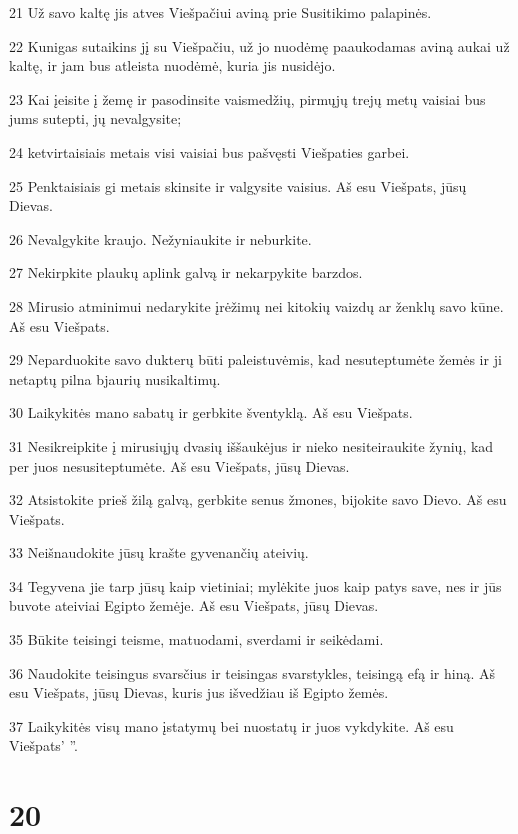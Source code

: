 \par 21 Už savo kaltę jis atves Viešpačiui aviną prie Susitikimo palapinės. 
\par 22 Kunigas sutaikins jį su Viešpačiu, už jo nuodėmę paaukodamas aviną aukai už kaltę, ir jam bus atleista nuodėmė, kuria jis nusidėjo. 
\par 23 Kai įeisite į žemę ir pasodinsite vaismedžių, pirmųjų trejų metų vaisiai bus jums sutepti, jų nevalgysite; 
\par 24 ketvirtaisiais metais visi vaisiai bus pašvęsti Viešpaties garbei. 
\par 25 Penktaisiais gi metais skinsite ir valgysite vaisius. Aš esu Viešpats, jūsų Dievas. 
\par 26 Nevalgykite kraujo. Nežyniaukite ir neburkite. 
\par 27 Nekirpkite plaukų aplink galvą ir nekarpykite barzdos. 
\par 28 Mirusio atminimui nedarykite įrėžimų nei kitokių vaizdų ar ženklų savo kūne. Aš esu Viešpats. 
\par 29 Neparduokite savo dukterų būti paleistuvėmis, kad nesuteptumėte žemės ir ji netaptų pilna bjaurių nusikaltimų. 
\par 30 Laikykitės mano sabatų ir gerbkite šventyklą. Aš esu Viešpats. 
\par 31 Nesikreipkite į mirusiųjų dvasių iššaukėjus ir nieko nesiteiraukite žynių, kad per juos nesusiteptumėte. Aš esu Viešpats, jūsų Dievas. 
\par 32 Atsistokite prieš žilą galvą, gerbkite senus žmones, bijokite savo Dievo. Aš esu Viešpats. 
\par 33 Neišnaudokite jūsų krašte gyvenančių ateivių. 
\par 34 Tegyvena jie tarp jūsų kaip vietiniai; mylėkite juos kaip patys save, nes ir jūs buvote ateiviai Egipto žemėje. Aš esu Viešpats, jūsų Dievas. 
\par 35 Būkite teisingi teisme, matuodami, sverdami ir seikėdami. 
\par 36 Naudokite teisingus svarsčius ir teisingas svarstykles, teisingą efą ir hiną. Aš esu Viešpats, jūsų Dievas, kuris jus išvedžiau iš Egipto žemės. 
\par 37 Laikykitės visų mano įstatymų bei nuostatų ir juos vykdykite. Aš esu Viešpats’ ”.



\chapter{20}


